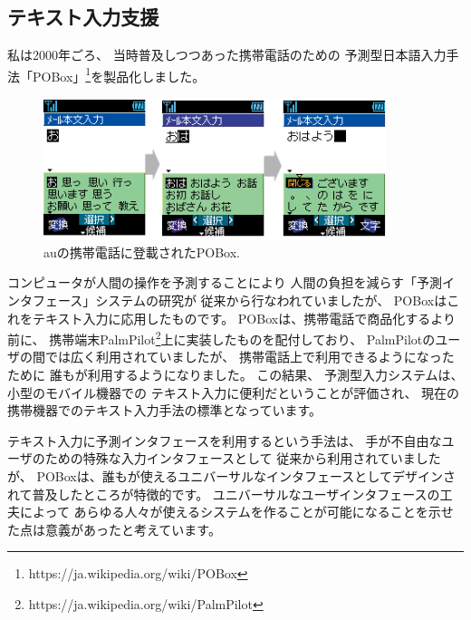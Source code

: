 \documentclass[topics]{compsoft} %
\begin{document}
\subsection{テキスト入力支援}

私は2000年ごろ、
当時普及しつつあった携帯電話のための
予測型日本語入力手法「POBox」\footnote{
  \textsf{https:{\slash}{\slash}ja.wikipedia.org{\slash}wiki{\slash}POBox}
}を製品化しました。

\begin{figure}[h]
  \includegraphics[width=10cm,bb=0 0 404 600]{figures/ac2b347a7042f920edd576ee07c4b7f4.png}
  \caption{auの携帯電話に登載されたPOBox.}
  \label{pobox}
\end{figure}

コンピュータが人間の操作を予測することにより
人間の負担を減らす「予測インタフェース」システムの研究が
従来から行なわれていましたが\cite{WatchWhatIDo}\cite{YourWish}、
POBoxはこれをテキスト入力に応用したものです。
%
POBoxは、携帯電話で商品化するより前に、
携帯端末PalmPilot\footnote{
  \textsf{https:{\slash}{\slash}ja.wikipedia.org{\slash}wiki{\slash}PalmPilot}
}上に実装したものを配付しており、
PalmPilotのユーザの間では広く利用されていましたが、
携帯電話上で利用できるようになったために
誰もが利用するようになりました。
この結果、
予測型入力システムは、小型のモバイル機器での
テキスト入力に便利だということが評価され、
現在の携帯機器でのテキスト入力手法の標準となっています。

テキスト入力に予測インタフェースを利用するという手法は、
手が不自由なユーザのための特殊な入力インタフェースとして
従来から利用されていましたが、
POBoxは、誰もが使えるユニバーサルなインタフェースとしてデザインされて普及したところが特徴的です。
ユニバーサルなユーザインタフェースの工夫によって
あらゆる人々が使えるシステムを作ることが可能になることを示せた点は意義があったと考えています。
\end{document}
